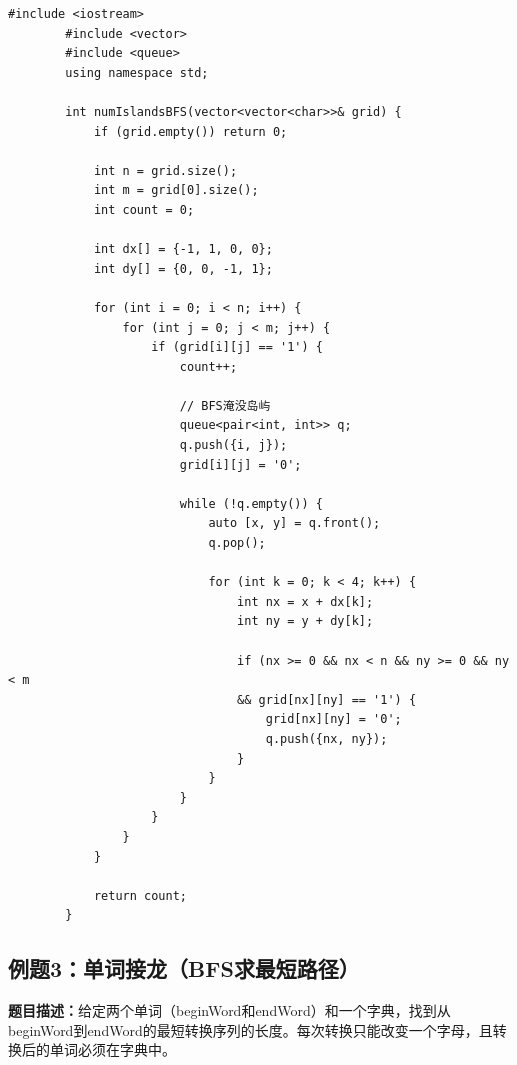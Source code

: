 \documentclass[12pt,a4paper]{article}
\begin{document}
	\begin{lstlisting}[caption={例题1变体：岛屿数量 - BFS解法}]
		#include <iostream>
		#include <vector>
		#include <queue>
		using namespace std;
		
		int numIslandsBFS(vector<vector<char>>& grid) {
			if (grid.empty()) return 0;
			
			int n = grid.size();
			int m = grid[0].size();
			int count = 0;
			
			int dx[] = {-1, 1, 0, 0};
			int dy[] = {0, 0, -1, 1};
			
			for (int i = 0; i < n; i++) {
				for (int j = 0; j < m; j++) {
					if (grid[i][j] == '1') {
						count++;
						
						// BFS淹没岛屿
						queue<pair<int, int>> q;
						q.push({i, j});
						grid[i][j] = '0';
						
						while (!q.empty()) {
							auto [x, y] = q.front();
							q.pop();
							
							for (int k = 0; k < 4; k++) {
								int nx = x + dx[k];
								int ny = y + dy[k];
								
								if (nx >= 0 && nx < n && ny >= 0 && ny < m 
								&& grid[nx][ny] == '1') {
									grid[nx][ny] = '0';
									q.push({nx, ny});
								}
							}
						}
					}
				}
			}
			
			return count;
		}
	\end{lstlisting}
	
	\subsection{例题3：单词接龙（BFS求最短路径）}
	
	\textbf{题目描述：}给定两个单词（beginWord和endWord）和一个字典，找到从beginWord到endWord的最短转换序列的长度。每次转换只能改变一个字母，且转换后的单词必须在字典中。
	
\end{document}
